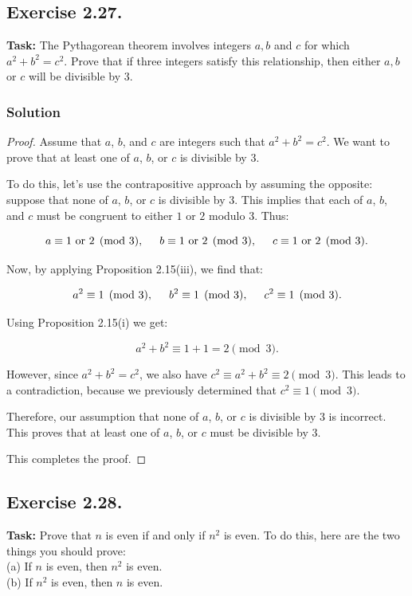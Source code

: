 \documentclass{article}
\begin{document}
\subsection{Exercise 2.27.}
\textbf{Task:} The Pythagorean theorem involves integers $a,b$ and $c$ for which $a^2+b^2=c^2$. Prove that if three integers satisfy this relationship, then either $a,b$ or $c$ will be divisible by 3.

\subsubsection*{Solution}

\begin{proof}
    Assume that $a$, $b$, and $c$ are integers such that $a^2 + b^2 = c^2$. We want to prove that at least one of $a$, $b$, or $c$ is divisible by 3.

    To do this, let’s use the contrapositive approach by assuming the opposite: suppose that none of $a$, $b$, or $c$ is divisible by 3. This implies that each of $a$, $b$, and $c$ must be congruent to either $1$ or $2$ modulo 3. Thus:

    \[
    a \equiv 1 \text{ or } 2 \pmod{3}, \hspace{0.5cm} b \equiv 1 \text{ or } 2 \pmod{3}, \hspace{0.5cm} c \equiv 1 \text{ or } 2 \pmod{3}.
    \]

    Now, by applying Proposition 2.15(iii), we find that:

    \[
    a^2 \equiv 1 \pmod{3}, \hspace{0.5cm} b^2 \equiv 1 \pmod{3}, \hspace{0.5cm} c^2 \equiv 1 \pmod{3}.
    \]

    Using Proposition 2.15(i) we get:

    \[
    a^2 + b^2 \equiv 1 + 1 = 2 \pmod{3}.
    \]

    However, since $a^2 + b^2 = c^2$, we also have $c^2 \equiv a^2 + b^2 \equiv 2 \pmod{3}$. This leads to a contradiction, because we previously determined that $c^2 \equiv 1 \pmod{3}$.

    Therefore, our assumption that none of $a$, $b$, or $c$ is divisible by 3 is incorrect. This proves that at least one of $a$, $b$, or $c$ must be divisible by 3.

    This completes the proof.
\end{proof}

\newpage

\subsection{Exercise 2.28.}
\textbf{Task:} Prove that $n$ is even if and only if $n^2$ is even. To do this, here are the two things you should prove:\\
(a) If $n$ is even, then $n^2$ is even.\\
(b) If $n^2$ is even, then $n$ is even.
\end{document}

